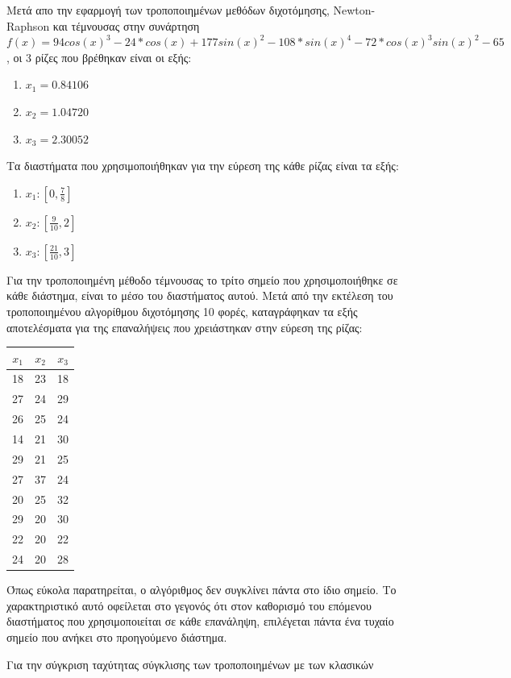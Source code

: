 \documentclass[a4paper,11pt]{article}
\newcommand{\lt}{\latintext}
\newcommand{\gt}{\greektext}
\begin{document}
    Μετά απο την εφαρμογή των τροποποιημένων μεθόδων διχοτόμησης, \lt Newton-Raphson
    \gt και τέμνουσας στην συνάρτηση $f(x)=94cos(x)^3-24*cos(x)+177sin(x)^2-
    108*sin(x)^4-72*cos(x)^3sin(x)^2-65$,  οι 3 ρίζες που βρέθηκαν είναι οι εξής:
    \begin{enumerate}
        \item $x_{1}=0.84106$
        \item $x_{2}=1.04720$
        \item $x_{3}=2.30052$
    \end{enumerate}
   Τα διαστήματα που χρησιμοποιήθηκαν για την εύρεση της κάθε ρίζας είναι τα
   εξής:
   \begin{enumerate}
        \item $x_{1}:[0,\frac{7}{8}]$ 
        \item $x_{2}:[\frac{9}{10},2]$
        \item $x_{3}:[\frac{21}{10},3]$
    \end{enumerate}
    \newpage
Για την τροποποιημένη μέθοδο τέμνουσας το τρίτο σημείο που χρησιμοποιήθηκε 
σε κάθε διάστημα, είναι το μέσο του διαστήματος αυτού.
Μετά από την εκτέλεση του τροποποιημένου αλγορίθμου διχοτόμησης 10 φορές, 
καταγράφηκαν τα εξής αποτελέσματα για της επαναλήψεις που χρειάστηκαν στην
εύρεση της ρίζας:
\begin{center}
\begin{tabular}{ |c|c|c| } 
 \hline
 $x_{1}$ & $x_{2}$ & $x_{3}$ \\ 
 \hline
 18 & 23 & 18 \\ 
 27 & 24 & 29 \\ 
 26 & 25 & 24 \\ 
 14 & 21 & 30 \\ 
 29 & 21 & 25 \\ 
 27 & 37 & 24 \\ 
 20 & 25 & 32 \\ 
 29 & 20 & 30 \\ 
 22 & 20 & 22 \\ 
 24 & 20 & 28 \\ 
 \hline
\end{tabular}
\end{center} 
Όπως εύκολα παρατηρείται, ο αλγόριθμος δεν συγκλίνει πάντα στο ίδιο σημείο.
Το χαρακτηριστικό αυτό οφείλεται στο γεγονός ότι στον καθορισμό του επόμενου 
διαστήματος που χρησιμοποιείται σε κάθε επανάληψη, επιλέγεται πάντα 
ένα τυχαίο σημείο που ανήκει στο προηγούμενο διάστημα.
\par
Για την σύγκριση ταχύτητας σύγκλισης των τροποποιημένων με των κλασικών 
\end{document}
